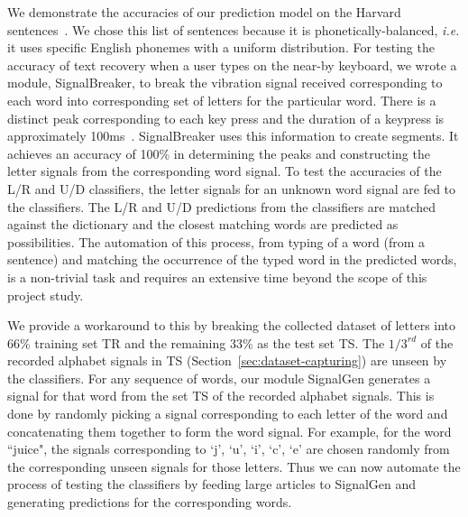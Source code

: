 \documentclass[11pt,conference]{IEEEtran}
\begin{document}
We demonstrate the accuracies of our prediction model on the Harvard
sentences~\cite{harvard-sentences}. We chose this list of sentences because
it is phonetically-balanced, \emph{i.e.} it uses specific English phonemes
with a uniform distribution. For testing the accuracy of text recovery when
a user types on the near-by keyboard, we wrote a module, SignalBreaker, to break the vibration
signal received corresponding to each word into corresponding set of letters for
the particular word. There is a distinct peak corresponding to each key press and
the duration of a keypress is approximately 100ms~\cite{spiphone}. SignalBreaker
uses this information to create segments. It achieves an accuracy of 100\% in
determining the peaks and constructing the letter signals from the corresponding word
signal. To test the accuracies of the L/R and U/D classifiers, the letter signals
for an unknown word signal are fed to the classifiers. The L/R and U/D predictions
from the classifiers are matched against the dictionary and the closest matching
words are predicted as possibilities. The automation of this process, from typing
of a word (from a sentence) and matching the occurrence of the typed word in the
predicted words, is a non-trivial task and requires an extensive time beyond the scope
of this project study.

We provide a workaround to this by breaking the collected dataset of
letters into 66\% training set TR and the remaining 33\% as the test set TS.
The $1/3^{rd}$ of the recorded
alphabet signals in TS (Section~\ref{sec:dataset-capturing}) are unseen by the classifiers.
For any sequence of words, our module SignalGen generates a
signal for that word from the set TS of the recorded alphabet signals.
This is done by randomly picking a signal corresponding to each letter of the word
and concatenating them together to form the word signal. For example, for the word
``juice", the signals corresponding to `j', `u', `i', `c', `e' are chosen randomly
from the corresponding unseen signals for those letters. Thus we can now automate
the process of testing the classifiers by feeding large articles to SignalGen
and generating predictions for the corresponding words.
\end{document}
